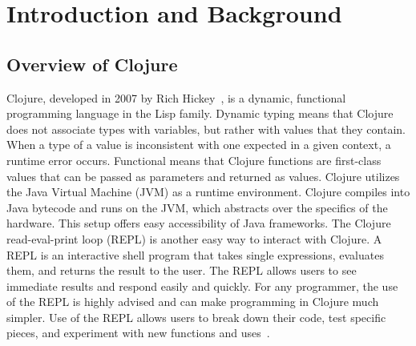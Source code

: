 \documentclass[12pt]{article}
\newcommand{\comment}[1]{{\bf \tt  {#1}}}
\newcommand{\emcomment}[1]{\textcolor{ForestGreen}{\comment{Elena: {#1}}}}
\newcommand{\hfcomment}[1]{\textcolor{Teal}{\comment{Henry: {#1}}}}
\begin{document}
\section{Introduction and Background}\label{sec:intro}
\subsection{Overview of Clojure}\label{sec:clojure}
  
  
Clojure, developed in 2007 by Rich Hickey~\cite{Hickey:2008}, is a dynamic, functional
programming language in the Lisp family.
Dynamic typing means that Clojure does not associate types with variables, but rather with values that they contain.
When a type of a value is inconsistent with one expected in a given context, a runtime error occurs.
Functional means
that Clojure functions are first-class values that can be passed as parameters and returned
as values.
Clojure utilizes the Java Virtual Machine (JVM) as a runtime environment. Clojure compiles into Java bytecode
and runs on the JVM, which abstracts over the specifics of the hardware.
This setup offers easy 
accessibility of Java frameworks. The Clojure read-eval-print loop (REPL)
is another easy way to interact 
 with Clojure. A REPL is an interactive shell program that takes single 
expressions, evaluates them, and returns the result to the user. The REPL allows users to see 
immediate results and respond easily and quickly. For any programmer, the use of the REPL 
is highly advised and can make programming in Clojure much simpler. Use of the REPL allows users
to break down their code, test specific pieces, and experiment with new functions and uses~\cite{clojure-REPL}.
\end{document}
